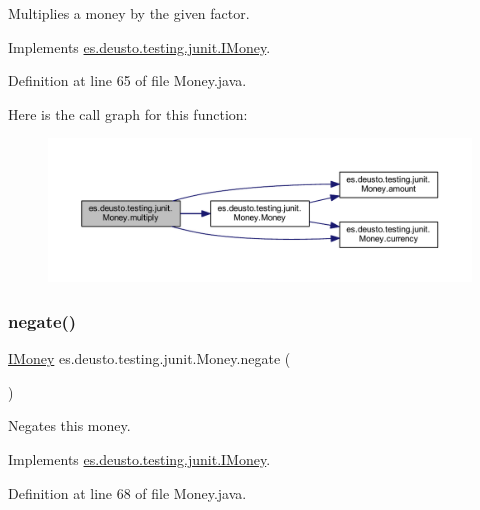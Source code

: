Multiplies a money by the given factor. 

Implements \hyperlink{interfacees_1_1deusto_1_1testing_1_1junit_1_1_i_money_a09154f9713133d4734f72d6a20081209}{es.\+deusto.\+testing.\+junit.\+I\+Money}.



Definition at line 65 of file Money.\+java.

Here is the call graph for this function\+:
\nopagebreak
\begin{figure}[H]
\begin{center}
\leavevmode
\includegraphics[width=350pt]{classes_1_1deusto_1_1testing_1_1junit_1_1_money_a02c7d4e9013710f70d1d46e9c9ebae88_cgraph}
\end{center}
\end{figure}
\mbox{\label{classes_1_1deusto_1_1testing_1_1junit_1_1_money_ae5f0bc3ea87f1fd55d6478653b8f2e36}} 
\subsubsection{\texorpdfstring{negate()}{negate()}}
{\footnotesize\ttfamily \hyperlink{interfacees_1_1deusto_1_1testing_1_1junit_1_1_i_money}{I\+Money} es.\+deusto.\+testing.\+junit.\+Money.\+negate (\begin{DoxyParamCaption}{ }\end{DoxyParamCaption})}

Negates this money. 

Implements \hyperlink{interfacees_1_1deusto_1_1testing_1_1junit_1_1_i_money_a741967d7aa89055b6873619303b11385}{es.\+deusto.\+testing.\+junit.\+I\+Money}.



Definition at line 68 of file Money.\+java.


